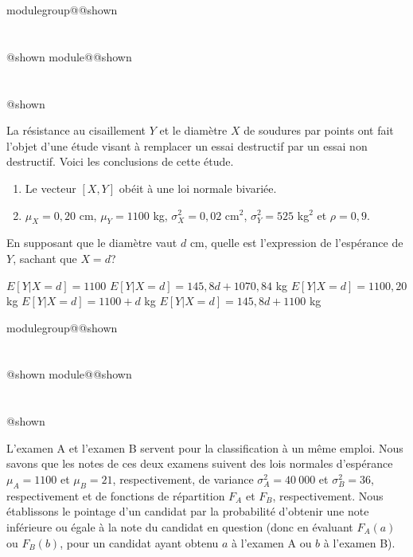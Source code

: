\documentclass{Evaluation}
\makeatletter
\newcommand{\currentmodulekey}{}
\newcommand{\currentmoduletitle}{}
\newcommand{\currentgroupkey}{}
\newcommand{\currentgrouptitle}{}
\newcommand{\showmoduleifneeded}{%
  \ifx\currentgroupkey\empty\else
    \expandafter\ifx\csname modulegroup@\currentgroupkey @shown\endcsname\relax
      \section*{\currentgrouptitle}%
      \expandafter\gdef\csname modulegroup@\currentgroupkey @shown\endcsname{1}%
    \fi
  \fi
  \expandafter\ifx\csname module@\currentmodulekey @shown\endcsname\relax
    \section*{\currentmoduletitle}%
    \expandafter\gdef\csname module@\currentmodulekey @shown\endcsname{1}%
  \fi
}
\newenvironment{H24}{\showmoduleifneeded}{}
\newenvironment{H26}{\showmoduleifneeded}{}
\makeatother
\begin{document}
\begin{questions}
\begin{H24}
\question {} %
La résistance au cisaillement $Y$ et le diamètre $X$ de soudures par points ont fait l'objet d'une étude visant à remplacer un essai destructif par un essai non destructif. Voici les conclusions de cette étude.
\begin{enumerate}
    \item Le vecteur $[X,Y]$ obéit à une loi normale bivariée.
    \item $\mu_X=0,20$ cm, $\mu_Y=1100$ kg, $\sigma^2_X=0,02$ cm$^2$, $\sigma^2_Y=525$ kg$^2$ et $\rho = 0,9$.
\end{enumerate}

En supposant que le diamètre vaut $d$ cm, quelle est l'expression de l'espérance de $Y$, sachant que $X=d$?

 \begin{checkboxes}
		\choice $E[Y|X=d]=1100$  %
		\correctchoice $E[Y|X=d]=145,8d + 1070,84$ kg %
		\choice $E[Y|X=d]=1100,20$ kg %
		\choice $E[Y|X=d]=1100+d$ kg%
		\choice $E[Y|X=d]=145,8d + 1100$ kg%
\end{checkboxes}

\end{H24}

\begin{H26}
\question {} %
L'examen A et l'examen B servent pour la classification à un même emploi.
Nous savons que les notes de ces deux examens suivent des lois normales d'espérance $\mu_{A}=1100$ et $\mu_{B}=21$, respectivement, de variance $\sigma^2_{A}=40\ 000$ et $\sigma^2_{B}=36$, respectivement et de fonctions de répartition $F_A$ et $F_B$, respectivement.
Nous établissons le pointage d'un candidat par la probabilité d'obtenir une note inférieure ou égale à la note du candidat en question (donc en évaluant $F_A(a)$ ou $F_B(b)$, pour un candidat ayant obtenu $a$ à l'examen A ou $b$ à l'examen B).

\end{H26}
\end{questions}
\end{document}
